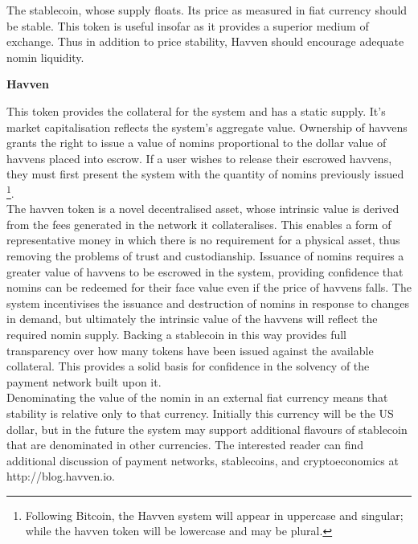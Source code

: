 \noindent The stablecoin, whose supply floats. Its price as measured in fiat currency should be stable. This token is useful insofar as it provides a superior medium of exchange. Thus in addition to price stability, Havven should encourage adequate nomin liquidity.

\vspace{2mm}

\noindent \textbf{Havven}

\vspace{1mm}

\noindent This token provides the collateral for the system and has a static supply. It’s market capitalisation reflects the system’s aggregate value. Ownership of havvens grants the right to issue a value of nomins proportional to the dollar value of havvens placed into escrow. If a user wishes to release their escrowed havvens, they must first present the system with the quantity of nomins previously issued \footnote{Following Bitcoin, the Havven system will appear in uppercase and singular; while the havven token will be lowercase and may be plural.}. \\

\noindent The havven token is a novel decentralised asset, whose intrinsic value is derived from the fees generated in the network it collateralises. This enables a form of representative money in which there is no requirement for a physical asset, thus removing the problems of trust and custodianship. Issuance of nomins requires a greater value of havvens to be escrowed in the system, providing confidence that nomins can be redeemed for their face value even if the price of havvens falls. The system incentivises the issuance and destruction of nomins in response to changes in demand, but ultimately the intrinsic value of the havvens will reflect the required nomin supply. Backing a stablecoin in this way provides full transparency over how many tokens have been issued against the available collateral. This provides a solid basis for confidence in the solvency of the payment network built upon it.\\

\noindent Denominating the value of the nomin in an external fiat currency means that stability is relative only to that currency. Initially this currency will be the US dollar, but in the future the system may support additional flavours of stablecoin that are denominated in other currencies. The interested reader can find additional discussion of payment networks, stablecoins, and cryptoeconomics at http://blog.havven.io.

\pagebreak
